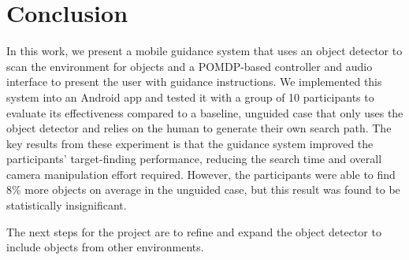 \documentclass[runningheads]{llncs}
\begin{document}
\section{Conclusion}\label{sec:conclusion}

In this work, we present a mobile guidance system that uses an object detector to scan the environment for objects and a POMDP-based controller and audio interface to present the user with guidance instructions. 
We implemented this system into an Android app and tested it with a group of 10 participants to evaluate its effectiveness compared to a baseline, unguided case that only uses the object detector and relies on the human to generate their own search path. 
The key results from these experiment is that the guidance system improved the participants' target-finding performance, reducing the search time and overall camera manipulation effort required.
However, the participants were able to find 8\% more objects on average in the unguided case, but this result was found to be statistically insignificant. 

The next steps for the project are to refine and expand the object detector to include objects from other environments. 



\end{document}
